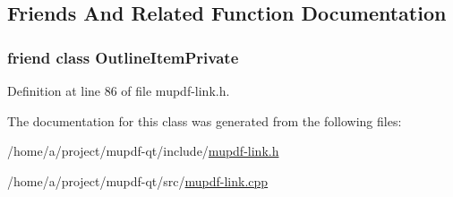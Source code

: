 \subsection{Friends And Related Function Documentation}
\hypertarget{class_mu_p_d_f_1_1_link_launch_ab008ed670017e41b6e6bba8707c775d2}{
\subsubsection[{Outline\-Item\-Private}]{\setlength{\rightskip}{0pt plus 5cm}friend class Outline\-Item\-Private\hspace{0.3cm}{\ttfamily [friend]}}}\label{class_mu_p_d_f_1_1_link_launch_ab008ed670017e41b6e6bba8707c775d2}


Definition at line 86 of file mupdf-\/link.\-h.



The documentation for this class was generated from the following files\-:\begin{DoxyCompactItemize}
\item 
/home/a/project/mupdf-\/qt/include/\hyperlink{mupdf-link_8h}{mupdf-\/link.\-h}\item 
/home/a/project/mupdf-\/qt/src/\hyperlink{mupdf-link_8cpp}{mupdf-\/link.\-cpp}\end{DoxyCompactItemize}
